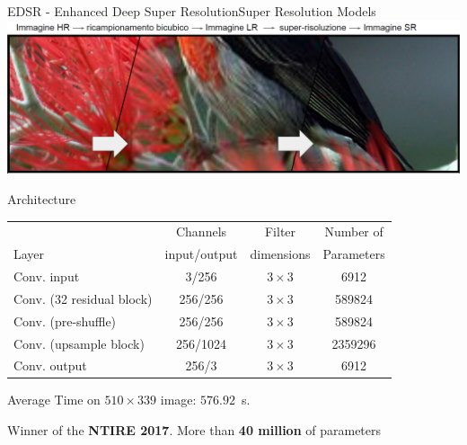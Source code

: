 \documentclass[10pt, unicode]{beamer}
\begin{document}
\begin{frame}{EDSR - Enhanced Deep Super Resolution}{Super Resolution Models}
  \centering
  \includegraphics[width=0.78\linewidth]{images/compare.png}


  \begin{alertblock}{Architecture}
    \scriptsize{
    \begin{tabular}{lccc}
      \hline \rowcolor{orange!20!white}
                               &  Channels     & Filter     & Number of    \\
      \rowcolor{orange!20!white}
      Layer                    & input/output  & dimensions & Parameters   \\
      \hline
      Conv. input              & 3/256      & $3\times3$   & 6912          \\
      Conv. (32 residual block)   & 256/256    & $3\times3$   & 589824        \\
      Conv. (pre-shuffle)      & 256/256    & $3\times3$   & 589824        \\
      Conv. (upsample block)   & 256/1024   & $3\times3$   & 2359296       \\
      Conv. output             & 256/3      & $3\times3$   & 6912          \\
      \hline
    \end{tabular}
    }

    \vspace{0.5cm}
    \scriptsize{Average Time on $510\times339$ image: $576.92$~s.}

    \scriptsize{Winner of the \textbf{NTIRE 2017}. More than \textbf{40 million} of parameters}
  \end{alertblock}

\end{frame}
\end{document}
